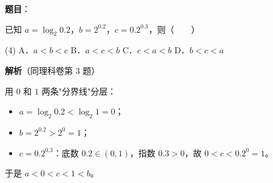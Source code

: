 \begin{answer}

\textbf{题目}：

已知 $a=\log_2 0.2$，$b=2^{0.2}$，$c=0.2^{0.3}$，则\mbox{（　　）}

\begin{gkopts}(4)
\task A．$a<b<c$
\task B．$a<c<b$
\task C．$c<a<b$
\task D．$b<c<a$
\end{gkopts}

\textbf{解析}（同理科卷第 3 题）

用 $0$ 和 $1$ 两条"分界线"分层：

\begin{itemize}
\item $a=\log_2 0.2<\log_2 1=0$；
\item $b=2^{0.2}>2^{0}=1$；
\item $c=0.2^{0.3}$：底数 $0.2\in(0,1)$，指数 $0.3>0$，故 $0<c<0.2^{0}=1$。
\end{itemize}

于是 $a<0<c<1<b$。


\par\medskip

\end{answer}
